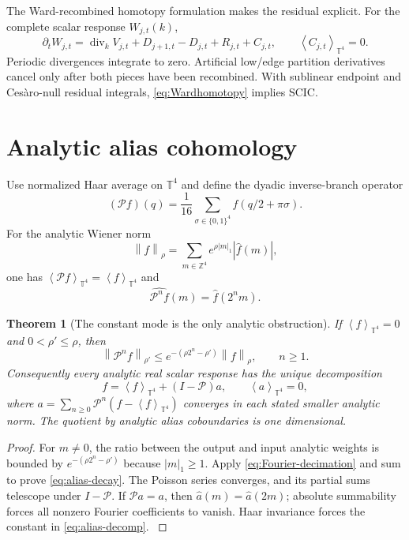 \documentclass[11pt,oneside,openany]{book}
\newtheorem{theorem}{Theorem}[chapter]
\theoremstyle{definition}
\theoremstyle{remark}
\newcommand{\Z}{\mathbb Z}
\newcommand{\T}{\mathbb T}
\newcommand{\norm}[1]{\left\lVert#1\right\rVert}
\newcommand{\avg}[1]{\left\langle#1\right\rangle_{\T^4}}
\newcommand{\src}[2]{\cite[#2]{#1}}
\begin{document}
The Ward-recombined homotopy formulation makes the residual explicit. For the complete scalar response $W_{j,t}(k)$,
\begin{equation}\label{eq:Wardhomotopy}
\partial_tW_{j,t}
=\operatorname{div}_kV_{j,t}
+D_{j+1,t}-D_{j,t}+R_{j,t}+C_{j,t},
\qquad \avg{C_{j,t}}=0.
\end{equation}
Periodic divergences integrate to zero. Artificial low/edge partition derivatives cancel only after both pieces have been recombined. With sublinear endpoint and Ces\`aro-null residual integrals, \cref{eq:Wardhomotopy} implies SCIC. \src{F9}{V15--V16}

\section{Analytic alias cohomology}
Use normalized Haar average on $\T^4$ and define the dyadic inverse-branch operator
\begin{equation}\label{eq:alias-P}
(\mathcal Pf)(q)=\frac1{16}\sum_{\sigma\in\{0,1\}^4}
f(q/2+\pi\sigma).
\end{equation}
For the analytic Wiener norm
\[
\norm{f}_\rho=\sum_{m\in\Z^4}e^{\rho|m|_1}|\widehat f(m)|,
\]
one has $\avg{\mathcal Pf}=\avg f$ and
\begin{equation}\label{eq:Fourier-decimation}
\widehat{\mathcal P^nf}(m)=\widehat f(2^nm).
\end{equation}

\begin{theorem}[The constant mode is the only analytic obstruction]\label{thm:alias}
If $\avg f=0$ and $0<\rho'\le\rho$, then
\begin{equation}\label{eq:alias-decay}
\norm{\mathcal P^nf}_{\rho'}
\le e^{-(\rho2^n-\rho')}\norm f_\rho,\qquad n\ge1.
\end{equation}
Consequently every analytic real scalar response has the unique decomposition
\begin{equation}\label{eq:alias-decomp}
f=\avg f+(I-\mathcal P)a,\qquad \avg a=0,
\end{equation}
where $a=\sum_{n\ge0}\mathcal P^n(f-\avg f)$ converges in each stated smaller analytic norm. The quotient by analytic alias coboundaries is one dimensional.
\end{theorem}
\begin{proof}
For $m\ne0$, the ratio between the output and input analytic weights is bounded by $e^{-(\rho2^n-\rho')}$ because $|m|_1\ge1$. Apply \cref{eq:Fourier-decimation} and sum to prove \cref{eq:alias-decay}. The Poisson series converges, and its partial sums telescope under $I-\mathcal P$. If $\mathcal Pa=a$, then $\widehat a(m)=\widehat a(2m)$; absolute summability forces all nonzero Fourier coefficients to vanish. Haar invariance forces the constant in \cref{eq:alias-decomp}. \src{F9}{V17}
\end{proof}
\end{document}

